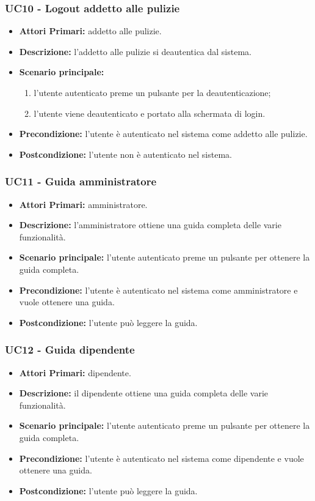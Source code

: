 \subsubsection{ UC10 - Logout addetto alle pulizie}
\begin{itemize}
	\item\textbf{Attori Primari:} 
	addetto alle pulizie.
	\item\textbf{Descrizione:} 
	l'addetto alle pulizie si deautentica dal sistema.
	\item\textbf{Scenario principale:} 
	\begin{enumerate}
		\item l'utente autenticato preme un pulsante per la deautenticazione;
		\item l'utente viene deautenticato e portato alla schermata di login.
	\end{enumerate}
	\item\textbf{Precondizione:} 
	l'utente è autenticato nel sistema come addetto alle pulizie.
	\item\textbf{Postcondizione:}
	l'utente non è autenticato nel sistema.
\end{itemize}

\subsubsection{ UC11 - Guida amministratore}
\begin{itemize}
	\item\textbf{Attori Primari:} 
	amministratore.
	\item\textbf{Descrizione:} 
	l'amministratore ottiene una guida completa delle varie funzionalità.
	\item\textbf{Scenario principale:} 
	l'utente autenticato preme un pulsante per ottenere la guida completa.
	\item\textbf{Precondizione:} 
	l'utente è autenticato nel sistema come amministratore e vuole ottenere una guida.
	\item\textbf{Postcondizione:}
	l'utente può leggere la guida.
\end{itemize}

\subsubsection{ UC12 - Guida dipendente}
\begin{itemize}
	\item\textbf{Attori Primari:} 
	dipendente.
	\item\textbf{Descrizione:} 
	il dipendente ottiene una guida completa delle varie funzionalità.
	\item\textbf{Scenario principale:} 
	l'utente autenticato preme un pulsante per ottenere la guida completa.
	\item\textbf{Precondizione:} 
	l'utente è autenticato nel sistema come dipendente e vuole ottenere una guida.
	\item\textbf{Postcondizione:}
	l'utente può leggere la guida.
\end{itemize}

